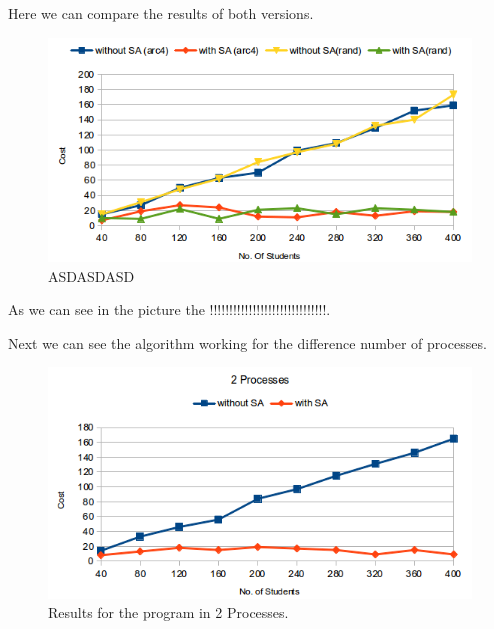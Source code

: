 \documentclass[a4paper,10pt,openright,openbib,twocolumn]{article}
\begin{document}
Here we can compare the results of both versions.

\begin{figure}[!htb]
    \centering
    \begin{minipage}[t]{\columnwidth}
        \includegraphics[width=\textwidth]{./img/mix.png}
        \caption{ASDASDASD\label{fig:parallel}}
    \end{minipage}
\end{figure}

As we can see in the picture the !!!!!!!!!!!!!!!!!!!!!!!!!!!!!!.

Next we can see the algorithm working for the difference number of processes.

\begin{figure}[!htb]
    \centering
    \begin{minipage}[t]{\columnwidth}
        \includegraphics[width=\textwidth]{./img/arc4-2.png}
        \caption{Results for the program in 2 Processes.\label{fig:parallel}}
    \end{minipage}
\end{figure}
\end{document}

